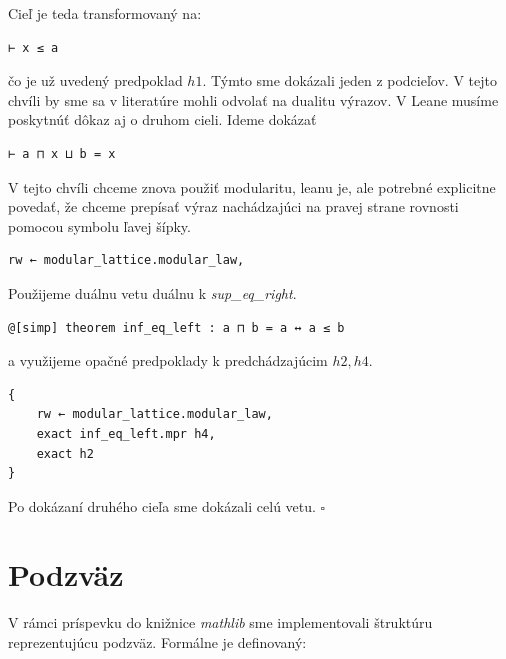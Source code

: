 \documentclass[a4paper,10pt,oneside]{report}%
\begin{document}
    Cieľ je teda transformovaný na:
\begin{lstlisting}
⊢ x ≤ a
\end{lstlisting}
čo je už uvedený predpoklad $h1$. Týmto sme dokázali jeden z podcieľov.
    V tejto chvíli by sme sa v literatúre mohli odvolať na dualitu výrazov.
    V Leane musíme poskytnúť dôkaz aj o druhom cieli. Ideme dokázať
\begin{lstlisting}
⊢ a ⊓ x ⊔ b = x
\end{lstlisting}
V tejto chvíli chceme znova použiť modularitu, leanu je, ale potrebné explicitne povedať,
    že chceme prepísať výraz nachádzajúci na pravej strane rovnosti pomocou symbolu
ľavej šípky.
\begin{lstlisting}
rw ← modular_lattice.modular_law,
\end{lstlisting}
    Použijeme duálnu vetu
    duálnu k \emph{sup\_eq\_right}.
\begin{lstlisting}
@[simp] theorem inf_eq_left : a ⊓ b = a ↔ a ≤ b
\end{lstlisting}
    a využijeme opačné predpoklady k predchádzajúcim $h2, h4$.
\begin{lstlisting}
{
    rw ← modular_lattice.modular_law,
    exact inf_eq_left.mpr h4,
    exact h2
}
\end{lstlisting}

    Po dokázaní druhého cieľa sme dokázali celú vetu. $\square$

\section{Podzväz}

    V rámci príspevku do knižnice \emph{mathlib} sme implementovali štruktúru
reprezentujúcu podzväz. Formálne je definovaný:
\end{document}
